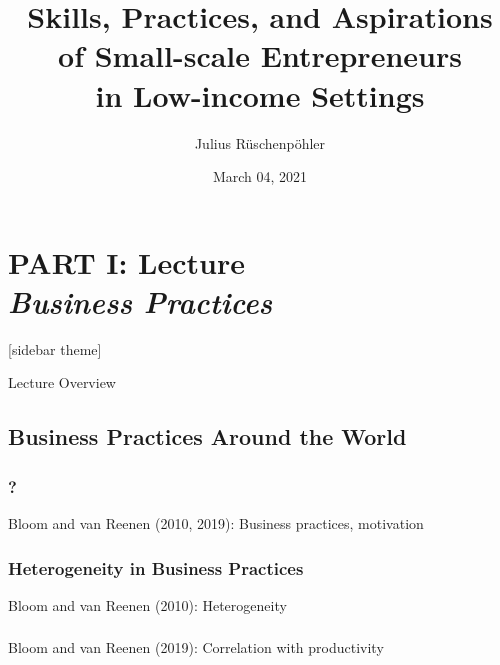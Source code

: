 \documentclass[hideothersubsections, usenames,dvipsnames,10pt]{beamer}
\title[]{Skills, Practices, and Aspirations \\ of Small-scale Entrepreneurs \\ in Low-income Settings}
\author[]{Julius R{\"u}schenp{\"o}hler\inst{}}
\institute[]{\inst{} UC Berkeley, CEGA}
\date{March 04, 2021}
\newenvironment{itemize_3pt}{\itemize\addtolength{\itemsep}{3pt}}{\enditemize}
\begin{document}



\section{\textbf{PART I: Lecture} \\ \quad \emph{Business Practices}}



\begin{frame}
\titlepage
\end{frame}


[sidebar theme]

\begin{frame}{Lecture Overview}
\end{frame}


\subsection{Business Practices Around the World}

\begin{frame}
\frametitle{?}
	\begin{itemize_3pt}
	\item Bloom and van Reenen (2010, 2019): Business practices, motivation
	\vspace{0.1in}
	\end{itemize_3pt}
\end{frame}

\begin{frame}
\frametitle{Heterogeneity in Business Practices}
	\begin{itemize_3pt}
	\item Bloom and van Reenen (2010): Heterogeneity
	\vspace{0.1in}
	\end{itemize_3pt}
\end{frame}

\begin{frame}
\frametitle{}
	\begin{itemize_3pt}
	\item Bloom and van Reenen (2019): Correlation with productivity
	\vspace{0.1in}
	\end{itemize_3pt}
\end{frame}
\end{document}
